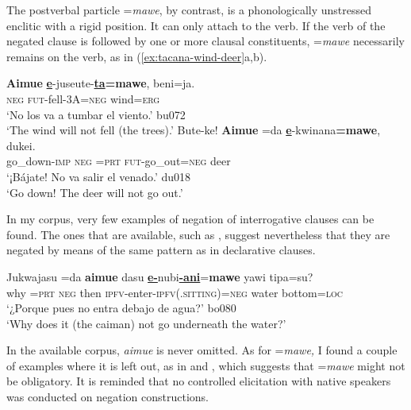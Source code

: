 \documentclass[output=paper,draft,draftmode,colorlinks,citecolor=brown]{langscibook}
\begin{document}
The postverbal particle =\textit{mawe}, by contrast, is a phonologically
unstressed enclitic with a rigid position. It can only attach to the verb.
If the verb of the negated clause is followed by one or more clausal
constituents, =\textit{mawe} necessarily remains on the verb, as in
(\ref{ex:tacana-wind-deer}a,b).

\begin{exe}\ex
\label{ex:tacana-wind-deer}      
\begin{xlist}
\ex\label{ex:tacana-wind}
\gll \textbf{Aimue} \textbf{\uline{e}}-juseute-\textbf{\uline{ta}=}\textbf{mawe}, beni=ja.\\
    \textsc{neg}  \textsc{fut}-fell-3A=\textsc{neg}  wind=\textsc{erg}\\
\glt `No los va a tumbar el viento.' bu072\\
`The wind will not fell (the trees).'
\ex\label{ex:tacana-deer}          
\gll  Bute-ke!  \textbf{Aimue}  =da \textbf{\uline{e}}-kwinana\textbf{=mawe}, dukei.\\
    go\_down-\textsc{imp}  \textsc{neg}  \textsc{=prt}
    \textsc{fut}-go\_out=\textsc{neg}  deer\\
\glt `¡Bájate! No va salir el venado.' du018\\
`Go down! The deer will not go out.'
\end{xlist}\end{exe}

In my corpus, very few examples of negation of interrogative clauses can be
found. The ones that are available, such as , suggest
nevertheless that they are negated by means of the same pattern as in declarative clauses.

\begin{exe}\ex
\label{ex:tacana-caiman}  
\gll Jukwajasu  =da  \textbf{aimue}  dasu
\textbf{\uline{e-}}nubi\textbf{\uline{-ani}}=\textbf{mawe} {\ob}yawi
tipa=su{\cb}?\\
 why  =\textsc{prt}  \textsc{neg}  then
 \textsc{ipfv}-enter-\textsc{ipfv(.sitting)}=\textsc{neg}  water
 bottom=\textsc{loc}\\
\glt `¿Porque pues no entra debajo de agua?' bo080\\
`Why does it (the caiman) not go underneath the water?' 
\end{exe}

In the available corpus, \textit{aimue} is never omitted. As for
=\textit{mawe,} I found a couple of examples where it is left out, as in
 and , which suggests
that =\textit{mawe} might not be obligatory. It is reminded that no
controlled elicitation with native speakers was conducted on negation
constructions.
\end{document}
